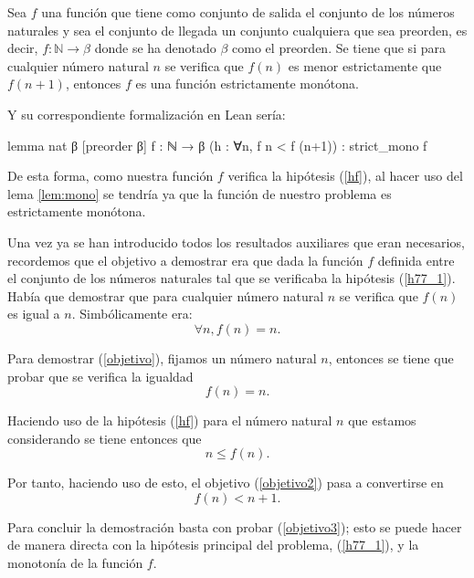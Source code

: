 \begin{demostracion}
  \begin{lema}\label{lem:mono}
    Sea \(f\) una función que tiene como conjunto de salida el conjunto
    de los números naturales y sea el conjunto de llegada un conjunto
    cualquiera que sea preorden, es decir, \(f:ℕ → β\) donde se ha
    denotado \(β\) como el preorden. Se tiene que si para cualquier
    número natural \(n\) se verifica que \(f(n)\) es menor estrictamente
    que \(f(n+1)\), entonces \(f\) es una función estrictamente
    monótona.
  \end{lema}

  Y su correspondiente formalización en Lean sería:
  \begin{leancode}
    lemma nat {β} [preorder β] {f : ℕ → β} (h : ∀n, f n < f (n+1)) :
    strict_mono f
  \end{leancode}

  De esta forma, como nuestra función \(f\) verifica la hipótesis
  (\ref{hf}), al hacer uso del lema \ref{lem:mono} se tendría ya que la
  función de nuestro problema es estrictamente monótona.

  Una vez ya se han introducido todos los resultados auxiliares que eran
  necesarios, recordemos que el objetivo a demostrar era que dada la
  función \(f\) definida entre el conjunto de los números naturales tal
  que se verificaba la hipótesis (\ref{h77_1}). Había que demostrar que
  para cualquier número natural \(n\) se verifica que \(f(n)\) es igual
  a \(n\). Simbólicamente era:
  \begin{equation}\label{objetivo}
    ∀n, f(n) = n.
  \end{equation}

  Para demostrar (\ref{objetivo}), fijamos un número natural \(n\),
  entonces se tiene que probar que se verifica la igualdad
  \begin{equation}\label{objetivo2}
    f(n) = n.
  \end{equation}

  Haciendo uso de la hipótesis (\ref{hf}) para el número natural \(n\)
  que estamos considerando se tiene entonces que
  \begin{equation}
    n ≤ f(n).
  \end{equation}

  Por tanto, haciendo uso de esto, el objetivo (\ref{objetivo2}) pasa a
  convertirse en
  \begin{equation}\label{objetivo3}
    f(n) < n+1.
  \end{equation}

  Para concluir la demostración basta con probar (\ref{objetivo3}); esto
  se puede hacer de manera directa con la hipótesis principal del
  problema, (\ref{h77_1}), y la monotonía de la función \(f\).
\end{demostracion}

